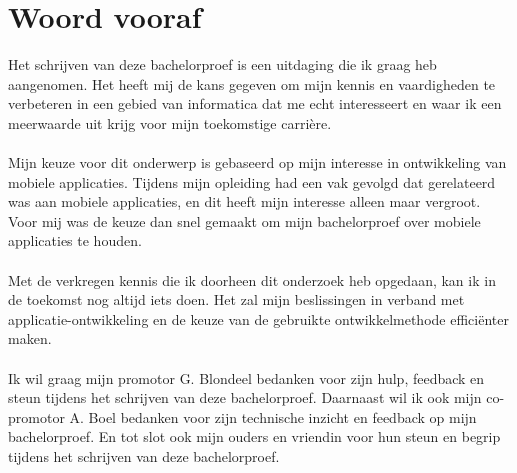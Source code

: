 
\chapter{Woord vooraf}
\label{ch:voorwoord}


Het schrijven van deze bachelorproef is een uitdaging die ik graag heb aangenomen. 
Het heeft mij de kans gegeven om mijn kennis en vaardigheden te verbeteren in een 
gebied van informatica dat me echt interesseert en waar ik een meerwaarde uit krijg
voor mijn toekomstige carrière.
\\\\
Mijn keuze voor dit onderwerp is gebaseerd op mijn interesse in ontwikkeling 
van mobiele applicaties. Tijdens mijn opleiding had een vak gevolgd dat gerelateerd was 
aan mobiele applicaties, en dit heeft mijn interesse alleen maar vergroot. Voor mij 
was de keuze dan snel gemaakt om mijn bachelorproef over mobiele applicaties te houden.
\\\\
Met de verkregen kennis die ik doorheen dit onderzoek heb opgedaan, kan ik in de toekomst
nog altijd iets doen. Het zal mijn beslissingen in verband met applicatie-ontwikkeling
en de keuze van de gebruikte ontwikkelmethode efficiënter maken.
\\\\
Ik wil graag mijn promotor G. Blondeel bedanken voor zijn hulp, feedback en steun tijdens het 
schrijven van deze bachelorproef. Daarnaast wil ik ook mijn co-promotor A. Boel bedanken voor 
zijn technische inzicht en feedback op mijn bachelorproef. En tot slot ook mijn ouders en vriendin
voor hun steun en begrip tijdens het schrijven van deze bachelorproef.